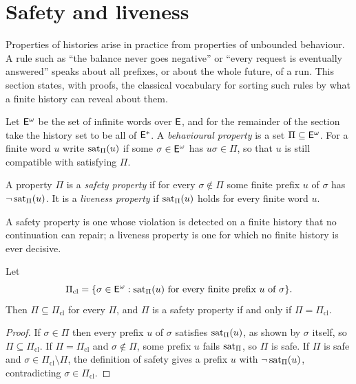 \section{Safety and liveness}

Properties of histories arise in practice from properties of unbounded behaviour. A rule such as ``the balance never goes negative'' or ``every request is eventually answered'' speaks about all prefixes, or about the whole future, of a run. This section states, with proofs, the classical vocabulary for sorting such rules by what a finite history can reveal about them.

Let $\mathsf{E}^{\omega}$ be the set of infinite words over $\mathsf{E}$, and for the remainder of the section take the history set to be all of $\mathsf{E}^{*}$. A \emph{behavioural property} is a set $\Pi\subseteq\mathsf{E}^{\omega}$. For a finite word $u$ write $\operatorname{sat}_\Pi(u)$ if some $\sigma\in\mathsf{E}^{\omega}$ has $u\sigma\in\Pi$, so that $u$ is still compatible with satisfying $\Pi$.

\begin{definition}\label{def:safety-liveness}
A property $\Pi$ is a \emph{safety property} if for every $\sigma\notin\Pi$ some finite prefix $u$ of $\sigma$ has $\neg\operatorname{sat}_\Pi(u)$. It is a \emph{liveness property} if $\operatorname{sat}_\Pi(u)$ holds for every finite word $u$.
\end{definition}

A safety property is one whose violation is detected on a finite history that no continuation can repair; a liveness property is one for which no finite history is ever decisive.

\begin{established}\label{prop:safety-closure}
Let
\[
\Pi_{\mathrm{cl}}=\{\sigma\in\mathsf{E}^{\omega}: \operatorname{sat}_\Pi(u)\text{ for every finite prefix }u\text{ of }\sigma\}.
\]
Then $\Pi\subseteq\Pi_{\mathrm{cl}}$ for every $\Pi$, and $\Pi$ is a safety property if and only if $\Pi=\Pi_{\mathrm{cl}}$.
\end{established}
\begin{proof}
If $\sigma\in\Pi$ then every prefix $u$ of $\sigma$ satisfies $\operatorname{sat}_\Pi(u)$, as shown by $\sigma$ itself, so $\Pi\subseteq\Pi_{\mathrm{cl}}$. If $\Pi=\Pi_{\mathrm{cl}}$ and $\sigma\notin\Pi$, some prefix $u$ fails $\operatorname{sat}_\Pi$, so $\Pi$ is safe. If $\Pi$ is safe and $\sigma\in\Pi_{\mathrm{cl}}\setminus\Pi$, the definition of safety gives a prefix $u$ with $\neg\operatorname{sat}_\Pi(u)$, contradicting $\sigma\in\Pi_{\mathrm{cl}}$.
\end{proof}

